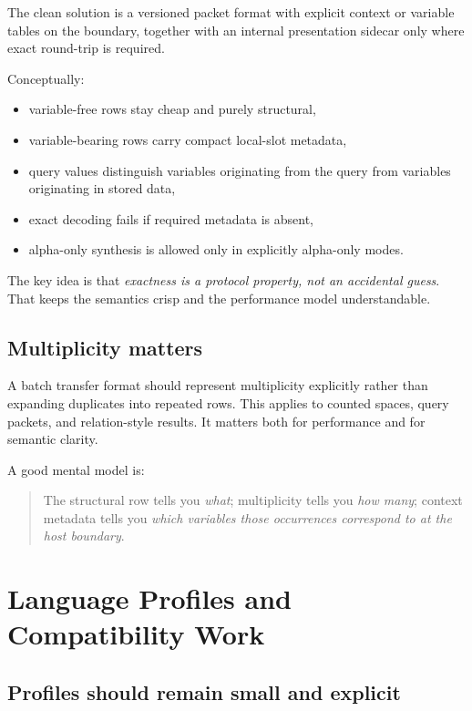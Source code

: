 \documentclass[11pt]{article}
\begin{document}
The clean solution is a versioned packet format with explicit context or variable tables on the boundary, together with an internal presentation sidecar only where exact round-trip is required.

Conceptually:

\begin{itemize}
  \item variable-free rows stay cheap and purely structural,
  \item variable-bearing rows carry compact local-slot metadata,
  \item query values distinguish variables originating from the query from variables originating in stored data,
  \item exact decoding fails if required metadata is absent,
  \item alpha-only synthesis is allowed only in explicitly alpha-only modes.
\end{itemize}

The key idea is that \emph{exactness is a protocol property, not an accidental guess}. That keeps the semantics crisp and the performance model understandable.

\subsection{Multiplicity matters}

A batch transfer format should represent multiplicity explicitly rather than expanding duplicates into repeated rows. This applies to counted spaces, query packets, and relation-style results. It matters both for performance and for semantic clarity.

A good mental model is:

\begin{quote}
The structural row tells you \emph{what}; multiplicity tells you \emph{how many}; context metadata tells you \emph{which variables those occurrences correspond to at the host boundary}.
\end{quote}

\section{Language Profiles and Compatibility Work}

\subsection{Profiles should remain small and explicit}
\end{document}
